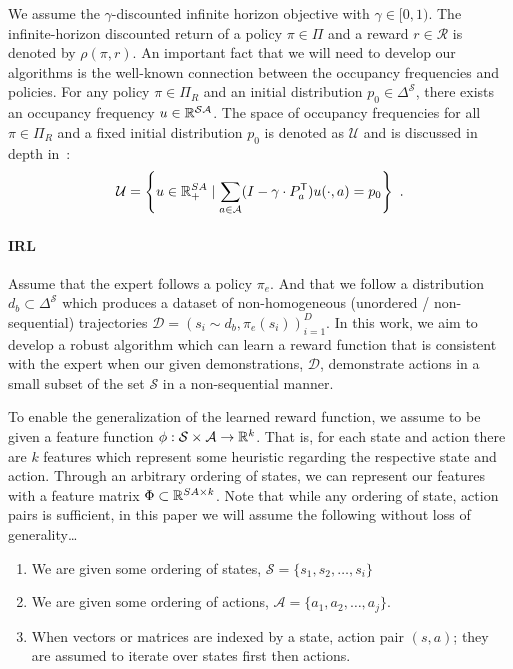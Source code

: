 \documentclass[11pt]{article}
\begin{document}
We assume the $\gamma$-discounted infinite horizon objective with $\gamma \in [0,1)$. 
The infinite-horizon discounted return of a policy $\pi \in \Pi$ and a reward $r \in \mathcal{R}$ is denoted by $\rho(\pi, r)$. 
An important fact that we will need to develop our algorithms is the well-known connection between the occupancy frequencies and policies. 
For any policy $\pi\in\Pi_R$ and an initial distribution $p_0\in \Delta^{\mathcal{S}}$, there exists an occupancy frequency $u\in \mathbb{R}^{\mathcal{S}\mathcal{A}}$. 
The space of occupancy frequencies for all $\pi\in \Pi_R$ and a fixed initial distribution $p_0$ is denoted as $\mathcal{U}$
and is discussed in depth in~\cite{PUTERMAN}:
\[
	\mathcal{U} = \left\{ u\in \mathbb{R}^{SA}_{+} \mid \sum_{a\in \mathcal{A}} (I - \gamma\cdot P^{\mathsf{T}}_a) u(\cdot, a) = p_0 \right\}~.
\]

\paragraph{IRL}
Assume that the expert follows a policy $\pi_e$. And that we follow a distribution $d_b \subset \Delta^{\mathcal{S}}$
which produces a dataset of non-homogeneous (unordered / non-sequential)
trajectories $\mathcal{D} = {(s_i \sim d_b, \pi_e(s_i))}_{i=1}^D$. In this work, we aim
to develop a robust algorithm which can learn a reward function that is
consistent with the expert when our given demonstrations, $\mathcal{D}$,
demonstrate actions in a small subset of the set $\mathcal{S}$ in a
non-sequential manner.

To enable the generalization of the learned reward function, we assume to be given a feature function $\phi: \mathcal{S} \times \mathcal{A}\to \mathbb{R}^k$. That is, for each state and action there are $k$ features which represent some heuristic regarding the respective state and action. Through an arbitrary ordering of states, we can represent our features with a feature matrix $\Phi \subset \mathbb{R}^{SA\times k}$. Note that while any ordering of state, action pairs is sufficient, in this paper we will assume the following without loss of generality\dots
\begin{enumerate}
	\item We are given some ordering of states, $\mathcal{S} = \{ s_1, s_2, \dots, s_i \}$
	\item We are given some ordering of actions, $\mathcal{A} = \{ a_1, a_2, \dots, a_j \}$.
	\item When vectors or matrices are indexed by a state, action pair $(s,a)$; they are assumed to iterate over
	      states first then actions.
\end{enumerate}
\end{document}
